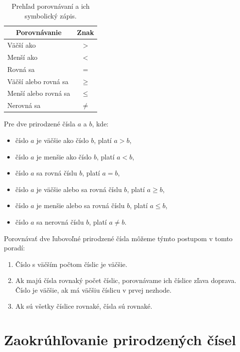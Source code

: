 \documentclass{article}
\begin{document}
\begin{table}[H]
  \centering
  \renewcommand{\arraystretch}{1.3}
  \begin{tabular}{|l|c|}
    \hline
    \multicolumn{1}{|c|}{Porovnávanie} &
    \multicolumn{1}{c|}{Znak} \\
    \hline
    Väčší ako & \(>\) \\
    Menší ako & \(<\) \\
    Rovná sa & \(=\) \\
    Väčší alebo rovná sa & \(\geq\) \\
    Menší alebo rovná sa & \(\leq\) \\
    Nerovná sa & \(\neq\) \\
    \hline
  \end{tabular}
  \caption{Prehľad porovnávaní a ich symbolický zápis.}
\end{table}

Pre dve prirodzené čísla \(a\) a \(b\), kde:
\begin{itemize}
  \item číslo \(a\) je väčšie ako číslo \(b\), platí \(a > b\),
  \item číslo \(a\) je menšie ako číslo \(b\), platí \(a < b\),
  \item číslo \(a\) sa rovná číslu \(b\), platí \(a = b\),
  \item číslo \(a\) je väčšie alebo sa rovná číslu \(b\), platí \(a \geq b\),
  \item číslo \(a\) je menšie alebo sa rovná číslu \(b\), platí \(a \leq b\),
  \item číslo \(a\) sa nerovná číslu \(b\), platí \(a \neq b\).
\end{itemize}
Porovnávať dve ľubovoľné prirodzené čísla môžeme týmto postupom v tomto poradí:
\begin{enumerate}[label=\arabic*)]
  \item Číslo s väčším počtom číslic je väčšie.
  \item Ak majú čísla rovnaký počet číslic, porovnávame ich číslice zľava doprava. Číslo je väčšie, ak má väčšiu číslicu v prvej nezhode.
  \item Ak sú všetky číslice rovnaké, čísla sú rovnaké.
\end{enumerate}

\section{Zaokrúhľovanie prirodzených čísel}
\end{document}

